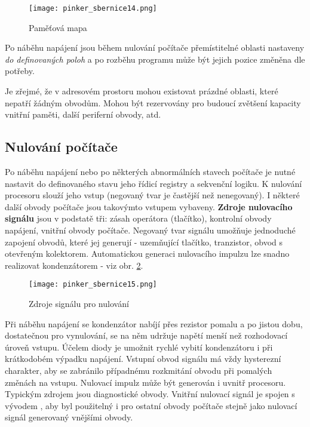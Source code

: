       \begin{figure}[ht!] %
        \centering
        \texttt{[image: pinker\_sbernice14.png]}
        \caption{Paměťová mapa}
        \label{MIT:fig_sbernice14}
      \end{figure}
      
      Po náběhu napájení jsou během nulování počítače přemístitelné oblasti nastaveny \emph{do 
      definovaných poloh} a po rozběhu programu může být jejich pozice změněna dle potřeby.
      
      Je zřejmé, že v adresovém prostoru mohou existovat prázdné oblasti, které nepatří žádným 
      obvodům. Mohou být rezervovány pro budoucí zvětšení kapacity vnitřní paměti, další periferní 
      obvody, atd.
      
    \subsection{Nulování počítače}
      Po náběhu napájení nebo po některých abnormálních stavech počítače je nutné nastavit do 
      definovaného stavu jeho řídicí registry a sekvenční logiku. K nulování procesoru slouží jeho 
      vstup \texttt{} (negovaný tvar je častější než nenegovaný). I některé 
      další obvody počítače jsou takovýmto vstupem vybaveny. \textbf{Zdroje nulovacího signálu} 
      jsou v podstatě tři: zásah operátora (tlačítko), kontrolní obvody napájení, vnitřní obvody 
      počítače. Negovaný tvar signálu umožňuje jednoduché zapojení obvodů, které jej generují - 
      uzemňující tlačítko, tranzistor, obvod s otevřeným kolektorem. Automatickou generaci 
      nulovacího impulzu lze snadno realizovat kondenzátorem - viz obr. \ref{MIT:fig_sbernice15}.
      
      \begin{figure}[ht!] %
        \centering
        \texttt{[image: pinker\_sbernice15.png]}
        \caption{Zdroje signálu pro nulování}
        \label{MIT:fig_sbernice15}
      \end{figure}
      
      Při náběhu napájení se kondenzátor nabíjí přes rezistor pomalu a po jistou dobu, dostatečnou 
      pro vynulování, se na něm udržuje napětí menší než rozhodovací úroveň vstupu. Účelem diody je 
      umožnit rychlé vybití kondenzátoru i při krátkodobém výpadku napájení. Vstupní obvod signálu 
      \texttt{} má vždy hysterezní charakter, aby se zabránilo případnému 
      rozkmitání obvodu při pomalých změnách na vstupu. Nulovací impulz může být generován i uvnitř 
      procesoru. Typickým zdrojem jsou diagnostické obvody. Vnitřní nulovací signál je spojen s 
      vývodem \texttt{}, aby byl použitelný i pro ostatní obvody počítače 
      stejně jako nulovací signál generovaný vnějšími obvody.
      

